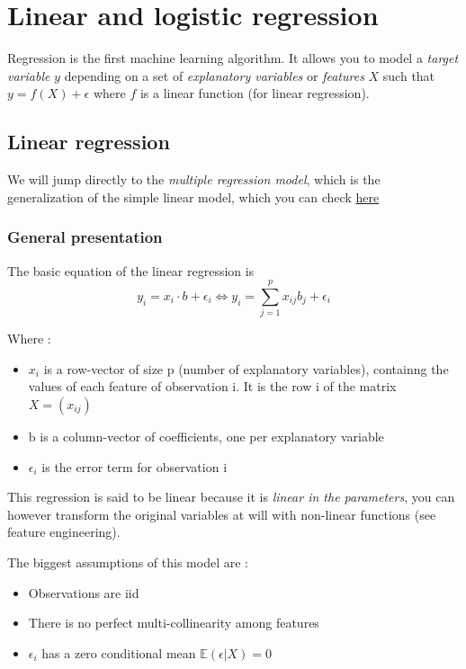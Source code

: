 \documentclass[
]{book}
\providecommand{\tightlist}{%
  \setlength{\itemsep}{0pt}\setlength{\parskip}{0pt}}
\begin{document}
\hypertarget{reg}{%
\chapter{Linear and logistic regression}\label{reg}}

Regression is the first machine learning algorithm. It allows you to model a \emph{target variable} \(y\) depending on a set of \emph{explanatory variables} or \emph{features} \(X\) such that \(y=f(X) + \epsilon\) where \(f\) is a linear function (for linear regression).

\hypertarget{linear-regression}{%
\section{Linear regression}\label{linear-regression}}

We will jump directly to the \emph{multiple regression model}, which is the generalization of the simple linear model, which you can check \href{https://www.econometrics-with-r.org/4-lrwor.html}{here}

\hypertarget{general-presentation}{%
\subsection{General presentation}\label{general-presentation}}

The basic equation of the linear regression is
\[ y_i = x_i \cdot b + \epsilon_i \Leftrightarrow y_i = \sum_{j=1}^p x_{ij} b_j + \epsilon_i\]

Where :

\begin{itemize}
\tightlist
\item
  \(x_i\) is a row-vector of size p (number of explanatory variables), containng the values of each feature of observation i. It is the row i of the matrix \(X = (x_{ij})\)
\item
  b is a column-vector of coefficients, one per explanatory variable
\item
  \(\epsilon_i\) is the error term for observation i
\end{itemize}

This regression is said to be linear because it is \emph{linear in the parameters}, you can however transform the original variables at will with non-linear functions (see feature engineering).

The biggest assumptions of this model are :

\begin{itemize}
\tightlist
\item
  Observations are iid
\item
  There is no perfect multi-collinearity among features
\item
  \(\epsilon_i\) has a zero conditional mean \(\mathbb{E}(\epsilon | X)=0\)
\end{itemize}
\end{document}
